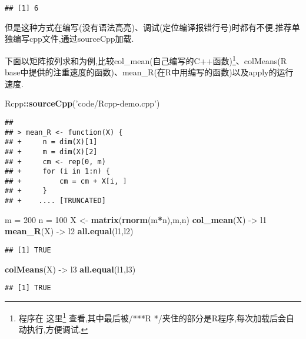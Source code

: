 \documentclass[]{ctexbook}
\newenvironment{Shaded}{\begin{snugshade}}{\end{snugshade}}
\newcommand{\DecValTok}[1]{\textcolor[rgb]{0.00,0.00,0.81}{#1}}
\newcommand{\KeywordTok}[1]{\textcolor[rgb]{0.13,0.29,0.53}{\textbf{#1}}}
\newcommand{\NormalTok}[1]{#1}
\newcommand{\OperatorTok}[1]{\textcolor[rgb]{0.81,0.36,0.00}{\textbf{#1}}}
\newcommand{\StringTok}[1]{\textcolor[rgb]{0.31,0.60,0.02}{#1}}
\renewcommand{\href}[2]{#2\footnote{\url{#1}}}
\begin{document}
\begin{verbatim}
## [1] 6
\end{verbatim}

但是这种方式在编写(没有语法高亮)、调试(定位编译报错行号)时都有不便.推荐单独编写cpp文件,通过sourceCpp加载.

下面以矩阵按列求和为例,比较col\_mean(自己编写的C++函数)\footnote{程序在 \href{\%22code/Rcpp-demo.cpp\%22}{这里} 查看,其中最后被/***R */夹住的部分是R程序,每次加载后会自动执行,方便调试.}、colMeans(R base中提供的注重速度的函数)、mean\_R(在R中用编写的函数)以及apply的运行速度.

\begin{Shaded}
\begin{Highlighting}[]
\NormalTok{Rcpp}\OperatorTok{::}\KeywordTok{sourceCpp}\NormalTok{(}\StringTok{'code/Rcpp-demo.cpp'}\NormalTok{)}
\end{Highlighting}
\end{Shaded}

\begin{verbatim}
## 
## > mean_R <- function(X) {
## +     n = dim(X)[1]
## +     m = dim(X)[2]
## +     cm <- rep(0, m)
## +     for (i in 1:n) {
## +         cm = cm + X[i, ]
## +     }
## +    .... [TRUNCATED]
\end{verbatim}

\begin{Shaded}
\begin{Highlighting}[]
\NormalTok{m =}\StringTok{ }\DecValTok{200}
\NormalTok{n =}\StringTok{ }\DecValTok{100}
\NormalTok{X <-}\StringTok{ }\KeywordTok{matrix}\NormalTok{(}\KeywordTok{rnorm}\NormalTok{(m}\OperatorTok{*}\NormalTok{n),m,n)}
\KeywordTok{col_mean}\NormalTok{(X) ->}\StringTok{ }\NormalTok{l1}
\KeywordTok{mean_R}\NormalTok{(X) ->}\StringTok{ }\NormalTok{l2}
\KeywordTok{all.equal}\NormalTok{(l1,l2)}
\end{Highlighting}
\end{Shaded}

\begin{verbatim}
## [1] TRUE
\end{verbatim}

\begin{Shaded}
\begin{Highlighting}[]
\KeywordTok{colMeans}\NormalTok{(X) ->}\StringTok{ }\NormalTok{l3}
\KeywordTok{all.equal}\NormalTok{(l1,l3)}
\end{Highlighting}
\end{Shaded}

\begin{verbatim}
## [1] TRUE
\end{verbatim}
\end{document}
